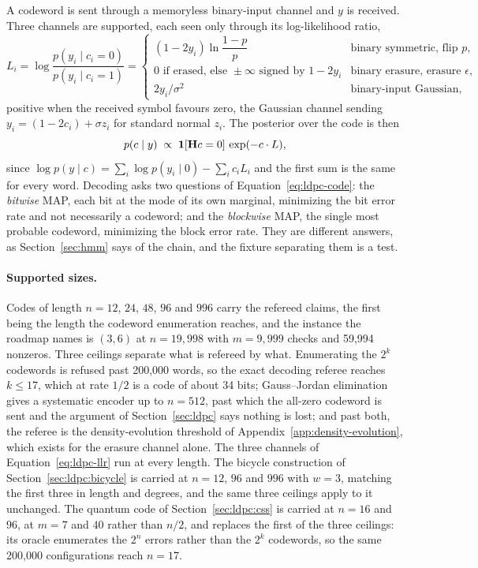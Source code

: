 \documentclass[11pt,a4paper]{article}
\begin{document}
A codeword is sent through a memoryless binary-input channel and $y$ is
received. Three channels are supported, each seen only through its
log-likelihood ratio,
\begin{equation}
  L_i = \log \frac{p(y_i \mid c_i = 0)}{p(y_i \mid c_i = 1)}
  = \begin{cases}
      (1 - 2 y_i) \ln \dfrac{1 - p}{p}
        & \text{binary symmetric, flip } p, \\[1.0ex]
      0 \text{ if erased, else } \pm\infty \text{ signed by } 1 - 2 y_i
        & \text{binary erasure, erasure } \epsilon, \\[0.6ex]
      2 y_i / \sigma^2
        & \text{binary-input Gaussian,}
    \end{cases}
  \label{eq:ldpc-llr}
\end{equation}
positive when the received symbol favours zero, the Gaussian channel sending
$y_i = (1 - 2 c_i) + \sigma z_i$ for standard normal $z_i$. The posterior over the code
is then
\begin{equation}
  p(c \mid y) \;\propto\; \mathbf{1}[\mathbf{H} c = 0]\, \exp(-c \cdot L),
  \label{eq:ldpc-code}
\end{equation}
since $\log p(y \mid c) = \sum_i \log p(y_i \mid 0) - \sum_i c_i L_i$ and the
first sum is the same for every word. Decoding asks two questions of
Equation~\ref{eq:ldpc-code}: the \emph{bitwise} MAP, each bit at the mode of
its own marginal, minimizing the bit error rate and not necessarily a codeword;
and the \emph{blockwise} MAP, the single most probable codeword, minimizing the
block error rate. They are different answers, as Section~\ref{sec:hmm} says of
the chain, and the fixture separating them is a test.

\paragraph{Supported sizes.}
\label{par:ldpc:sizes}
Codes of length $n = 12$, $24$, $48$, $96$ and $996$ carry the refereed
claims, the first being the length the codeword enumeration reaches, and
the instance the roadmap names is $(3, 6)$ at $n = 19{,}998$ with $m =
9{,}999$ checks and 59,994 nonzeros. Three ceilings separate what is refereed
by what. Enumerating the $2^{k}$ codewords is refused past 200,000 words, so
the exact decoding referee reaches $k \le 17$, which at rate $1/2$ is a code
of about 34 bits; Gauss--Jordan elimination gives a systematic encoder up to
$n = 512$, past which the all-zero codeword is sent and the argument of
Section~\ref{sec:ldpc} says nothing is lost; and past both, the referee is
the density-evolution threshold of Appendix~\ref{app:density-evolution},
which exists for the erasure channel alone. The three channels of
Equation~\ref{eq:ldpc-llr} run at every length. The bicycle construction of
Section~\ref{sec:ldpc:bicycle} is carried at $n = 12$, $96$ and $996$ with
$w = 3$, matching the first three in length and degrees, and the same three
ceilings apply to it unchanged. The quantum code of
Section~\ref{sec:ldpc:css} is carried at $n = 16$ and $96$, at $m = 7$ and
$40$ rather than $n/2$, and replaces the first of the three ceilings: its
oracle enumerates the $2^n$ errors rather than the $2^k$ codewords, so the
same 200,000 configurations reach $n = 17$.
\end{document}
